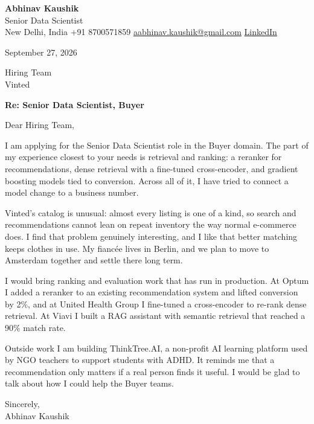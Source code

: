 \documentclass[11pt,a4paper]{article}
\begin{document}
{\Large\bfseries Abhinav Kaushik}\\
Senior Data Scientist\\
New Delhi, India \textbar{} +91 8700571859 \textbar{} \href{mailto:aabhinav.kaushik@gmail.com}{aabhinav.kaushik@gmail.com} \textbar{} \href{https://www.linkedin.com/in/abhinav-kaushik10/}{LinkedIn}  

September 27, 2026

Hiring Team\\
Vinted

\textbf{Re: Senior Data Scientist, Buyer}

Dear Hiring Team,

I am applying for the Senior Data Scientist role in the Buyer domain. The part of my experience closest to your needs is retrieval and ranking: a reranker for recommendations, dense retrieval with a fine-tuned cross-encoder, and gradient boosting models tied to conversion. Across all of it, I have tried to connect a model change to a business number.

Vinted's catalog is unusual: almost every listing is one of a kind, so search and recommendations cannot lean on repeat inventory the way normal e-commerce does. I find that problem genuinely interesting, and I like that better matching keeps clothes in use. My fiancée lives in Berlin, and we plan to move to Amsterdam together and settle there long term.

I would bring ranking and evaluation work that has run in production. At Optum I added a reranker to an existing recommendation system and lifted conversion by 2\%, and at United Health Group I fine-tuned a cross-encoder to re-rank dense retrieval. At Viavi I built a RAG assistant with semantic retrieval that reached a 90\% match rate.

Outside work I am building ThinkTree.AI, a non-profit AI learning platform used by NGO teachers to support students with ADHD. It reminds me that a recommendation only matters if a real person finds it useful. I would be glad to talk about how I could help the Buyer teams.

Sincerely,\\[4pt]
Abhinav Kaushik
\end{document}
